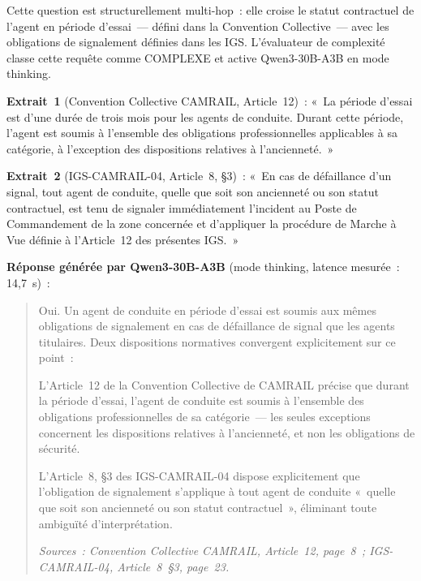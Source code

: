 \documentclass[12pt,a4paper]{report}
\begin{document}
Cette question est structurellement multi-hop~: elle croise le statut contractuel de l'agent
en période d'essai~--- défini dans la Convention Collective~--- avec les obligations de
signalement définies dans les IGS. L'évaluateur de complexité classe cette requête comme
COMPLEXE et active Qwen3-30B-A3B en mode thinking.

\textbf{Extrait~1} (Convention Collective CAMRAIL, Article~12)~: «~La période d'essai est d'une
durée de trois mois pour les agents de conduite. Durant cette période, l'agent est soumis à
l'ensemble des obligations professionnelles applicables à sa catégorie, à l'exception des
dispositions relatives à l'ancienneté.~»

\textbf{Extrait~2} (IGS-CAMRAIL-04, Article~8, §3)~: «~En cas de défaillance d'un signal, tout
agent de conduite, quelle que soit son ancienneté ou son statut contractuel, est tenu de signaler
immédiatement l'incident au Poste de Commandement de la zone concernée et d'appliquer la
procédure de Marche à Vue définie à l'Article~12 des présentes IGS.~»

\textbf{Réponse générée par Qwen3-30B-A3B} (mode thinking, latence mesurée~: 14,7~s)~:

\begin{quote}
Oui. Un agent de conduite en période d'essai est soumis aux mêmes obligations de signalement
en cas de défaillance de signal que les agents titulaires. Deux dispositions normatives
convergent explicitement sur ce point~:

L'Article~12 de la Convention Collective de CAMRAIL précise que durant la période d'essai,
l'agent de conduite est soumis à l'ensemble des obligations professionnelles de sa catégorie~---
les seules exceptions concernent les dispositions relatives à l'ancienneté, et non les
obligations de sécurité.

L'Article~8, §3 des IGS-CAMRAIL-04 dispose explicitement que l'obligation de signalement
s'applique à tout agent de conduite «~quelle que soit son ancienneté ou son statut
contractuel~», éliminant toute ambiguïté d'interprétation.

\textit{Sources~: Convention Collective CAMRAIL, Article~12, page~8~;
IGS-CAMRAIL-04, Article~8~§3, page~23.}
\end{quote}
\end{document}
